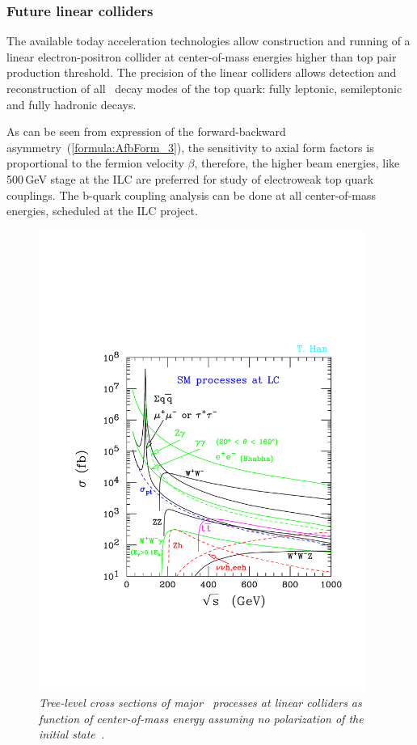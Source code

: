 \subsubsection{Future linear colliders}

The available today acceleration technologies allow construction and running of a linear electron-positron collider at center-of-mass energies higher than top pair production threshold. The precision of the linear colliders allows detection and reconstruction of all \sm\ decay modes of the top quark: fully leptonic, semileptonic and fully hadronic decays. 

As can be seen from expression of the forward-backward asymmetry~(\ref{formula:AfbForm_3}), the sensitivity to axial form factors is proportional to the fermion velocity $\beta$, therefore, the higher beam energies, like 500\,GeV stage at the ILC are preferred for study of electroweak top quark couplings. 
The b-quark coupling analysis can be done at all center-of-mass energies, scheduled at the ILC project.
\begin{figure}[h]
{\centering
    \includegraphics[clip, trim=0.5cm 5cm 0.5cm 7cm, width=0.95\textwidth]{ILD/graphics/epem_sm-hepph.pdf}
    \caption{\sl Tree-level cross sections of major \sm\ processes at linear colliders as function of center-of-mass energy assuming no polarization of the initial state~\cite{bib:Han}.}
    \label{fig:LCcrosssection}
  }
\end{figure}


